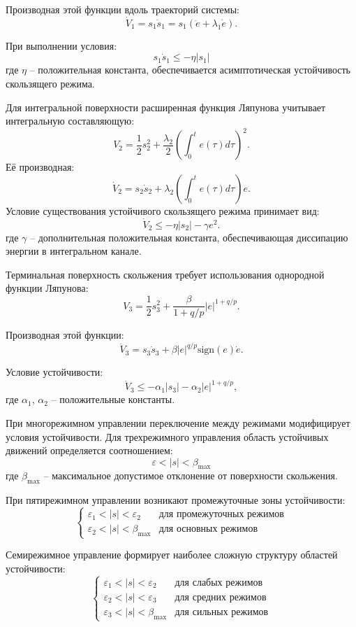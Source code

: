 Производная этой функции вдоль траекторий системы:
$$
\dot{V}_1 = s_1\dot{s}_1 = s_1(\ddot{e} + \lambda_1\dot{e}).
$$

При выполнении условия:
$$
s_1\dot{s}_1 \leq -\eta|s_1|
$$
где $\eta$ -- положительная константа, обеспечивается асимптотическая устойчивость скользящего режима.

Для интегральной поверхности расширенная функция Ляпунова учитывает интегральную составляющую:
$$
V_2 = \frac{1}{2}s_2^2 + \frac{\lambda_2}{2}\left(\int_0^t e(\tau)d\tau\right)^2.
$$
Её производная:
$$
\dot{V}_2 = s_2\dot{s}_2 + \lambda_2\left(\int_0^t e(\tau)d\tau\right)e.
$$
Условие существования устойчивого скользящего режима принимает вид:
$$
\dot{V}_2 \leq -\eta|s_2| - \gamma e^2.
$$
где $\gamma$ -- дополнительная положительная константа, обеспечивающая диссипацию энергии в интегральном канале.

Терминальная поверхность скольжения требует использования однородной функции Ляпунова:
$$
V_3 = \frac{1}{2}s_3^2 + \frac{\beta}{1+q/p}|e|^{1+q/p}.
$$

Производная этой функции:
$$
\dot{V}_3 = s_3\dot{s}_3 + \beta|e|^{q/p}\text{sign}(e)\dot{e}.
$$

Условие устойчивости:
$$
\dot{V}_3 \leq -\alpha_1|s_3| - \alpha_2|e|^{1+q/p},
$$
где $\alpha_1$, $\alpha_2$ -- положительные константы.

При многорежимном управлении переключение между режимами модифицирует
условия устойчивости. Для трехрежимного управления
область устойчивых движений определяется соотношением:
$$
\varepsilon < |s| < \beta_{\text{max}}
$$
где $\beta_{\text{max}}$ -- максимальное допустимое отклонение от поверхности скольжения.

При пятирежимном управлении возникают промежуточные зоны устойчивости:
$$
\begin{cases}
\varepsilon_1 < |s| < \varepsilon_2 & \text{для промежуточных режимов} \\
\varepsilon_2 < |s| < \beta_{\text{max}} & \text{для основных режимов}
\end{cases}
$$

Семирежимное управление формирует наиболее сложную структуру областей устойчивости:
$$
\begin{cases}
\varepsilon_1 < |s| < \varepsilon_2 & \text{для слабых режимов} \\
\varepsilon_2 < |s| < \varepsilon_3 & \text{для средних режимов} \\
\varepsilon_3 < |s| < \beta_{\text{max}} & \text{для сильных режимов}
\end{cases}
$$

